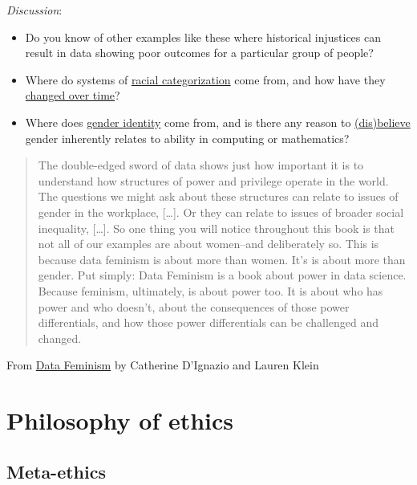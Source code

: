 \documentclass[]{book}
\providecommand{\tightlist}{%
  \setlength{\itemsep}{0pt}\setlength{\parskip}{0pt}}
\theoremstyle{definition}
\theoremstyle{definition}
\theoremstyle{definition}
\theoremstyle{remark}
\begin{document}
\emph{Discussion}:

\begin{itemize}
\tightlist
\item
  Do you know of other examples like these where historical injustices
  can result in data showing poor outcomes for a particular group of
  people?
\item
  Where do systems of
  \href{https://en.wikipedia.org/wiki/Historical_race_concepts}{racial
  categorization} come from, and how have they
  \href{https://www.pewsocialtrends.org/interactives/multiracial-timeline/}{changed
  over time}?
\item
  Where does
  \href{https://en.wikipedia.org/wiki/Social_construction_of_gender}{gender
  identity} come from, and is there any reason to
  \href{https://chance.amstat.org/2014/11/visiphilia/}{(dis)believe}
  gender inherently relates to ability in computing or mathematics?
\end{itemize}

\begin{quote}
The double-edged sword of data shows just how important it is to
understand how structures of power and privilege operate in the world.
The questions we might ask about these structures can relate to issues
of gender in the workplace, {[}\ldots{}{]}. Or they can relate to issues
of broader social inequality, {[}\ldots{}{]}. So one thing you will
notice throughout this book is that not all of our examples are about
women--and deliberately so. This is because data feminism is about more
than women. It's is about more than gender. Put simply: Data Feminism is
a book about power in data science. Because feminism, ultimately, is
about power too. It is about who has power and who doesn't, about the
consequences of those power differentials, and how those power
differentials can be challenged and changed.
\end{quote}

From \href{https://bookbook.pubpub.org/pub/dgv16l22}{Data Feminism} by
Catherine D'Ignazio and Lauren Klein

\section{Philosophy of ethics}\label{philosophy-of-ethics}

\subsection{Meta-ethics}\label{meta-ethics}
\end{document}
